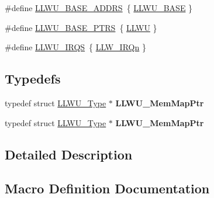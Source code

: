 \begin{DoxyCompactItemize}
\item 
\#define \hyperlink{group__LLWU__Peripheral__Access__Layer_ga3d947ff94f2db32873659ceeeb8bc767}{L\+L\+W\+U\+\_\+\+B\+A\+S\+E\+\_\+\+A\+D\+D\+RS}~\{ \hyperlink{group__LLWU__Peripheral__Access__Layer_ga5596067d46debe317ac368bfc5db21f8}{L\+L\+W\+U\+\_\+\+B\+A\+SE} \}
\item 
\#define \hyperlink{group__LLWU__Peripheral__Access__Layer_ga4826d688973513cc02a2f1d4f67c336b}{L\+L\+W\+U\+\_\+\+B\+A\+S\+E\+\_\+\+P\+T\+RS}~\{ \hyperlink{group__LLWU__Peripheral__Access__Layer_gaed2d6ced03dff7739533096e53983dbe}{L\+L\+WU} \}
\item 
\#define \hyperlink{group__LLWU__Peripheral__Access__Layer_ga00f85a14dffe324ff8e867f8b06f1461}{L\+L\+W\+U\+\_\+\+I\+R\+QS}~\{ \hyperlink{group__Interrupt__vector__numbers_gga666eb0caeb12ec0e281415592ae89083a072e6f3fb1f5403cfb71eeaefe647a50}{L\+L\+W\+\_\+\+I\+R\+Qn} \}
\end{DoxyCompactItemize}
\subsection*{Typedefs}
\begin{DoxyCompactItemize}
\item 
typedef struct \hyperlink{structLLWU__Type}{L\+L\+W\+U\+\_\+\+Type} $\ast$ {\bfseries L\+L\+W\+U\+\_\+\+Mem\+Map\+Ptr}\hypertarget{group__LLWU__Peripheral__Access__Layer_gaf93c3f7cb6f9aab387dbeafff610076d}{}\label{group__LLWU__Peripheral__Access__Layer_gaf93c3f7cb6f9aab387dbeafff610076d}

\item 
typedef struct \hyperlink{structLLWU__Type}{L\+L\+W\+U\+\_\+\+Type} $\ast$ {\bfseries L\+L\+W\+U\+\_\+\+Mem\+Map\+Ptr}\hypertarget{group__LLWU__Peripheral__Access__Layer_gaf93c3f7cb6f9aab387dbeafff610076d}{}\label{group__LLWU__Peripheral__Access__Layer_gaf93c3f7cb6f9aab387dbeafff610076d}

\end{DoxyCompactItemize}


\subsection{Detailed Description}


\subsection{Macro Definition Documentation}
